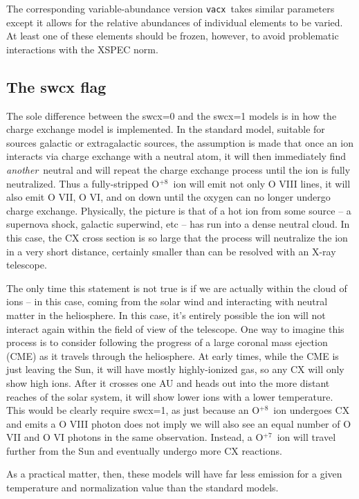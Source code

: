 \documentclass[11pt]{article}
\begin{document}
The corresponding variable-abundance version {\tt vacx}\ takes similar
parameters except it allows for the relative abundances of individual
elements to be varied.  At least one of these elements should be
frozen, however, to avoid problematic interactions with the XSPEC
norm.

\subsection*{The swcx flag\label{subsec:swcx}}

The sole difference between the swcx=0 and the swcx=1 models is in how
the charge exchange model is implemented.  In the standard model,
suitable for sources galactic or extragalactic sources, the
assumption is made that once an ion interacts via charge exchange with
a neutral atom, it will then immediately find {\sl another}\ neutral
and will repeat the charge exchange process until the ion is fully
neutralized.  Thus a fully-stripped O$^{+8}$\ ion will emit not only O
VIII lines, it will also emit O VII, O VI, and on down until the
oxygen can no longer undergo charge exchange.  Physically, the picture
is that of a hot ion from some source -- a supernova shock, galactic
superwind, etc -- has run into a dense neutral cloud.  In this case,
the CX cross section is so large that the process will neutralize the
ion in a very short distance, certainly smaller than can be resolved
with an X-ray telescope.  

The only time this statement is not true is if we are actually within
the cloud of ions -- in this case, coming from the solar wind and
interacting with neutral matter in the heliosphere.  In this case,
it's entirely possible the ion will not interact again within the
field of view of the telescope.  One way to imagine this process is to
consider following the progress of a large coronal mass ejection (CME)
as it travels through the heliosphere.  At early times, while the CME
is just leaving the Sun, it will have mostly highly-ionized gas, so
any CX will only show high ions.  After it crosses one AU and heads
out into the more distant reaches of the solar system, it will show
lower ions with a lower temperature.  This would be clearly require
swcx=1, as just because an O$^{+8}$\ ion undergoes CX and emits a O
VIII photon does not imply we will also see an equal number of O VII
and O VI photons in the same observation.  Instead, a O$^{+7}$\ ion
will travel further from the Sun and eventually undergo more CX
reactions.  

As a practical matter, then, these models will have far less emission
for a given temperature and normalization value than the standard
models.
\end{document}
